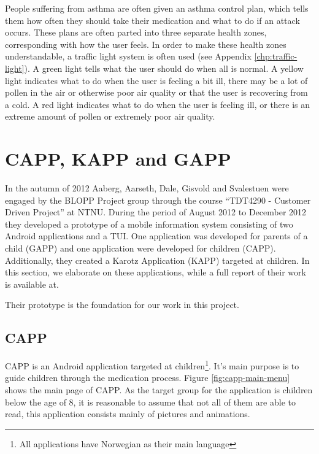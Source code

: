 People suffering from asthma are often given an asthma control plan, which tells them how often they should take their medication and what to do if an attack occurs. These plans are often parted into three separate health zones, corresponding with how the user feels. In order to make these health zones understandable, a traffic light system is often used (see Appendix \ref{chp:traffic-light}). A green light tells what the user should do when all is normal. A yellow light indicates what to do when the user is feeling a bit ill, there may be a lot of pollen in the air or otherwise poor air quality or that the user is recovering from a cold. A red light indicates what to do when the user is feeling ill, or there is an extreme amount of pollen or extremely poor air quality.  


\section{CAPP, KAPP and GAPP}
\label{sec:cappgappkapp}
In the autumn of 2012 Aaberg, Aarseth, Dale, Gisvold and Svalestuen were engaged by the BLOPP Project group through the course ``TDT4290 - Customer Driven Project'' at NTNU. During the period of August 2012 to December 2012 they developed a prototype of a mobile information system consisting of two Android applications and a TUI. One application was developed for parents of a child (GAPP) and one application were developed for children (CAPP). Additionally, they created a Karotz Application (KAPP) targeted at children. In this section, we elaborate on these applications, while a full report of their work is available at\cite{CustomerDriven}. 

Their prototype is the foundation for our work in this project. 


\subsection{CAPP}
\label{sec:description-capp}
CAPP is an Android application targeted at children\footnote{All applications have Norwegian as their main language}. It's main purpose is to guide children through the medication process. Figure \ref{fig:capp-main-menu} shows the main page of CAPP.  
As the target group for the application is children below the age of 8, it is reasonable to assume that not all of them are able to read, this application consists mainly of pictures and animations.


